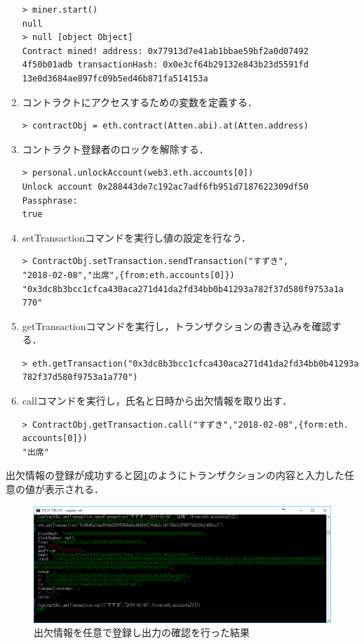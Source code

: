 \begin{enumerate}
\begin{verbatim}
> miner.start()
null
> null [object Object]
Contract mined! address: 0x77913d7e41ab1bbae59bf2a0d07492
4f50b01adb transactionHash: 0x0e3cf64b29132e843b23d5591fd
13e0d3684ae897fc09b5ed46b871fa514153a
\end{verbatim}
\newpage
\item コントラクトにアクセスするための変数を定義する．
\begin{verbatim}
> contractObj = eth.contract(Atten.abi).at(Atten.address)
\end{verbatim}
\item コントラクト登録者のロックを解除する．
\begin{verbatim}
> personal.unlockAccount(web3.eth.accounts[0])
Unlock account 0x288443de7c192ac7adf6fb951d7187622309df50
Passphrase:
true
\end{verbatim}
\item setTransactionコマンドを実行し値の設定を行なう．
\begin{verbatim}
> ContractObj.setTransaction.sendTransaction("すずき",
"2018-02-08","出席",{from:eth.accounts[0]})
"0x3dc8b3bcc1cfca430aca271d41da2fd34bb0b41293a782f37d580f9753a1a
770"
\end{verbatim}
\item getTransactionコマンドを実行し，トランザクションの書き込みを確認する．
\begin{verbatim}
> eth.getTransaction("0x3dc8b3bcc1cfca430aca271d41da2fd34bb0b41293a
782f37d580f9753a1a770")
\end{verbatim}
\item callコマンドを実行し，氏名と日時から出欠情報を取り出す．
\begin{verbatim}
> ContractObj.getTransaction.call("すずき","2018-02-08",{form:eth.
accounts[0]})
"出席"
\end{verbatim}
\end{enumerate}

出欠情報の登録が成功すると図\ref{attendance}のようにトランザクションの内容と入力した任意の値が表示される．

\begin{figure}[htb]
\centering
\includegraphics[width=12cm]{images/attendance.png}
\caption{出欠情報を任意で登録し出力の確認を行った結果}\label{attendance}
\end{figure}

